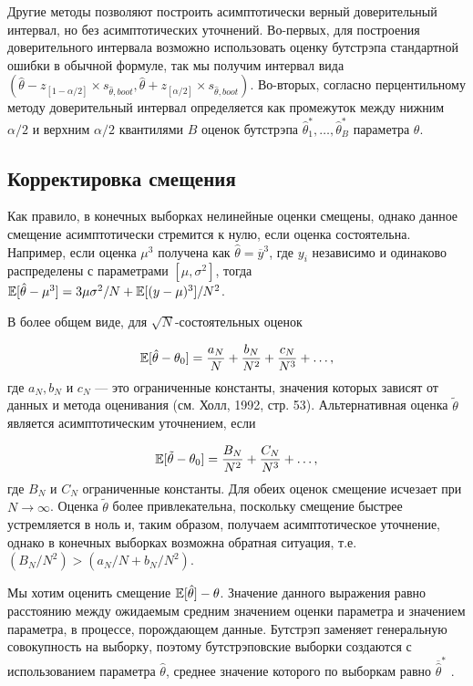 Другие методы позволяют построить асимптотически верный доверительный интервал, но без асимптотических уточнений. Во-первых, для построения доверительного интервала возможно использовать оценку бутстрэпа стандартной ошибки в обычной формуле, так мы получим интервал вида $(\hat{\theta}-z_{[1-\alpha/2]} \times s_{\hat{\theta},boot},\hat{\theta}+z_{[\alpha/2]}{\times}s_{\hat{\theta},boot})$. Во-вторых, согласно перцентильному методу доверительный интервал определяется как промежуток между нижним $\alpha/2$ и верхним $\alpha/2$ квантилями $B$ оценок бутстрэпа $\hat{\theta}_1^*,\ldots, \hat{\theta}_B^*$ параметра $\theta$.

\subsection{Корректировка смещения}

Как правило, в конечных выборках нелинейные оценки смещены, однако данное смещение  асимптотически стремится к нулю, если оценка состоятельна. Например, если оценка $\mu^3$ получена как $\hat{\theta}=\overline{y}^3$, где $y_i$ независимо и одинаково распределены с параметрами $[\mu,\sigma^2]$, тогда $\mathbb{E}[\hat{\theta}-\mu^3]=3\mu\sigma^2/N+\mathbb{E}[(y-\mu)^3]/N^2$.

В более общем виде, для $\sqrt{N}$-состоятельных оценок

\begin{equation}
\mathbb{E}[\hat{\theta}-\theta_0]=\dfrac{a_N}{N}+\dfrac{b_N}{N^2}+\dfrac{c_N}{N^3}+\ldots ,
\end{equation}
где $a_N,b_N$ и $c_N$ --- это ограниченные константы, значения которых зависят от данных и метода оценивания (см. Холл, 1992, стр. 53). Альтернативная оценка $\tilde{\theta}$ является асимптотическим уточнением, если 

\begin{equation}
\mathbb{E}[\tilde{\theta}-\theta_0]=\dfrac{B_N}{N^2}+\dfrac{C_N}{N^3}+\ldots,
\end{equation}
где $B_N$ и $C_N$ ограниченные константы. Для обеих оценок смещение исчезает при $N \rightarrow \infty$. Оценка $\tilde{\theta}$ более привлекательна, поскольку смещение быстрее устремляется в ноль и, таким образом, получаем  асимптотическое уточнение, однако в конечных выборках возможна обратная ситуация, т.е. $(B_N/N^2)>(a_N/N+b_N/N^2)$.

Мы хотим оценить смещение $\mathbb{E}[\hat{\theta}]-\theta$. Значение данного выражения равно расстоянию между ожидаемым средним значением оценки параметра и значением параметра, в процессе, порождающем данные. Бутстрэп заменяет генеральную совокупность на выборку, поэтому бутстрэповские выборки создаются с использованием параметра $\hat{\theta}$, среднее значение которого по выборкам равно $\overline{\hat{\theta}}^*$ . 

